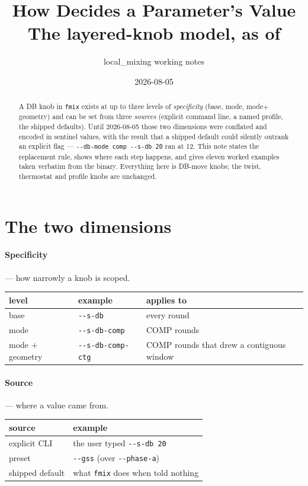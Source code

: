 \documentclass[11pt]{article}
\title{How \code{fmix} Decides a Parameter's Value\\
\large The layered-knob model, as of \code{e3cf2b54}}
\author{local\_mixing working notes}
\date{2026-08-05}
\newcommand{\code}[1]{\texttt{#1}}
\begin{document}
\maketitle

\begin{abstract}
A DB knob in \code{fmix} exists at up to three levels of \emph{specificity}
(base, mode, mode$+$geometry) and can be set from three \emph{sources}
(explicit command line, a named profile, the shipped defaults). Until
2026-08-05 those two dimensions were conflated and encoded in sentinel
values, with the result that a shipped default could silently outrank an
explicit flag --- \code{-{}-db-mode comp -{}-s-db 20} ran at 12. This note
states the replacement rule, shows where each step happens, and gives eleven
worked examples taken verbatim from the binary. Everything here is DB-move
knobs; the twist, thermostat and profile knobs are unchanged.
\end{abstract}

\tableofcontents
\newpage

\section{The two dimensions}

\paragraph{Specificity} --- how narrowly a knob is scoped.

\begin{center}\small
\begin{tabular}{lll}
\toprule
level & example & applies to \\
\midrule
base & \code{-{}-s-db} & every round \\
mode & \code{-{}-s-db-comp} & COMP rounds \\
mode $+$ geometry & \code{-{}-s-db-comp-ctg} & COMP rounds that drew a contiguous window \\
\bottomrule
\end{tabular}
\end{center}

\paragraph{Source} --- where a value came from.

\begin{center}\small
\begin{tabular}{ll}
\toprule
source & example \\
\midrule
explicit CLI & the user typed \code{-{}-s-db 20} \\
preset & \code{-{}-gss} (over \code{-{}-phase-a}) \\
shipped default & what \code{fmix} does when told nothing \\
\bottomrule
\end{tabular}
\end{center}
\end{document}
